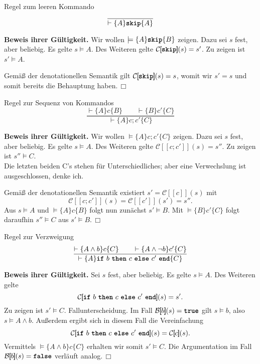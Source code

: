 \documentclass[8pt,fleqn,aspectratio=169]{beamer}
\newcommand{\strong}[1]{\textsf{\textbf{#1}}}
\renewcommand{\qedsymbol}{\ensuremath{\Box}}
\newcommand{\parspace}{\vspace{0.8em}}
\newcommand{\kw}[1]{\textbf{\texttt{#1}}}
\newcommand{\qb}[1]{[\!\![#1]\!\!]}
\newcommand{\evB}{\mathcal B}
\newcommand{\evC}{\mathcal C}
\begin{document}
\begin{frame}
\begin{block}{Regel zum leeren Kommando}
\[\dfrac{}{\vdash\{A\}\kw{skip}\{A\}}\]
\end{block}\pause
\strong{Beweis ihrer Gültigkeit.}
Wir wollen $\models\{A\}\kw{skip}\{B\}$ zeigen.
Dazu sei $s$ fest, aber beliebig. Es gelte $s\models A$. Des Weiteren
gelte $\evC\qb{\kw{skip}}(s)=s'$. Zu zeigen ist $s'\models A$.\pause

\parspace
Gemäß der denotationellen Semantik gilt $\evC\qb{\kw{skip}}(s)=s$, womit
wir $s'=s$ und somit bereits die Behauptung haben.\,\qedsymbol
\end{frame}

\begin{frame}
\begin{block}{Regel zur Sequenz von Kommandos}
\[\dfrac{\vdash\{A\}c\{B\}\qquad \vdash\{B\}c'\{C\}}{\vdash\{A\}c; c'\{C\}}\]
\end{block}\pause
\strong{Beweis ihrer Gültigkeit.} Wir wollen $\models\{A\} c; c'\{C\}$ zeigen.
Dazu sei $s$ fest, aber beliebig. Es gelte $s\models A$. Des Weiteren
gelte $\evC\qb{c;c'}(s)=s''$. Zu zeigen ist $s''\models C$.\\
{\footnotesize Die letzten beiden C's stehen für Unterschiedliches; aber eine
Verwechslung ist ausgeschlossen, denke ich.}\pause

\parspace
Gemäß der denotationellen Semantik existiert $s'=\evC\qb{c}(s)$ mit
\[\evC\qb{c;c'}(s) = \evC\qb{c'}(s')=s''.\]
Aus $s\models A$ und $\models\{A\}c\{B\}$ folgt nun zunächst $s'\models B$.
Mit $\models\{B\}c'\{C\}$ folgt daraufhin $s''\models C$ aus
$s'\models B$.\,\qedsymbol
\end{frame}

\begin{frame}
\begin{block}{Regel zur Verzweigung}
\[\dfrac{\vdash\{A\land b\}c\{C\}\qquad\vdash\{A\land\lnot b\}c'\{C\}}{
\vdash\{A\}\text{\kw{if} $b$ \kw{then} $c$ \kw{else} $c'$ \kw{end}}\{C\}}\]
\end{block}\pause
\strong{Beweis ihrer Gültigkeit.} Sei $s$ fest, aber beliebig.
Es gelte $s\models A$. Des Weiteren gelte
\[\evC\qb{\text{\kw{if} $b$ \kw{then} $c$ \kw{else} $c'$ \kw{end}}}(s) = s'.\]
Zu zeigen ist $s'\models C$.\pause{} Fallunterscheidung. Im Fall
$\evB\qb{b}(s)=\kw{true}$ gilt $s\models b$, also $s\models A\land b$.
Außerdem ergibt sich in diesem Fall die Vereinfachung
\[\evC\qb{\text{\kw{if} $b$ \kw{then} $c$ \kw{else} $c'$ \kw{end}}}(s) = \evC\qb{c}(s).\]
Vermittels $\models\{A\land b\}c\{C\}$ erhalten wir somit $s'\models C$.
Die Argumentation im Fall $\evB\qb{b}(s)=\kw{false}$ verläuft analog.\,\qedsymbol
\end{frame}
\end{document}
